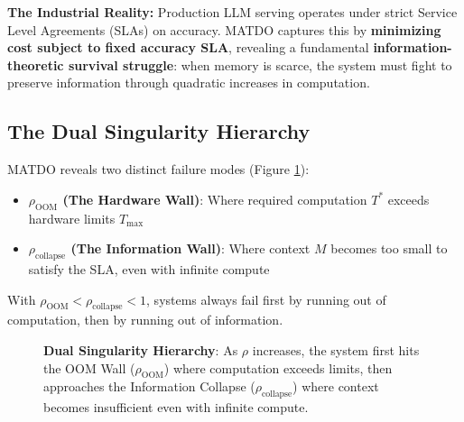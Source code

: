 \documentclass[11pt,a4paper]{article}
\theoremstyle{plain}
\theoremstyle{definition}
\theoremstyle{remark}
\begin{document}
\textbf{The Industrial Reality:} Production LLM serving operates under strict Service Level Agreements (SLAs) on accuracy. MATDO captures this by \textbf{minimizing cost subject to fixed accuracy SLA}, revealing a fundamental \textbf{information-theoretic survival struggle}: when memory is scarce, the system must fight to preserve information through quadratic increases in computation.

\subsection{The Dual Singularity Hierarchy}

MATDO reveals two distinct failure modes (Figure \ref{fig:hierarchy}):
\begin{itemize}
    \item \textbf{$\rho_{\text{OOM}}$ (The Hardware Wall)}: Where required computation $T^*$ exceeds hardware limits $T_{\max}$
    \item \textbf{$\rho_{\text{collapse}}$ (The Information Wall)}: Where context $M$ becomes too small to satisfy the SLA, even with infinite compute
\end{itemize}

With $\rho_{\text{OOM}} < \rho_{\text{collapse}} < 1$, systems always fail first by running out of computation, then by running out of information.

\begin{figure}[h]
\centering
{}
\caption{\textbf{Dual Singularity Hierarchy}: As $\rho$ increases, the system first hits the OOM Wall ($\rho_{\text{OOM}}$) where computation exceeds limits, then approaches the Information Collapse ($\rho_{\text{collapse}}$) where context becomes insufficient even with infinite compute.}
\label{fig:hierarchy}
\end{figure}
\end{document}
